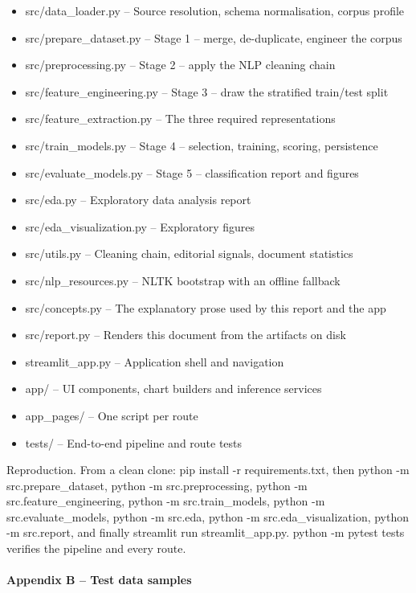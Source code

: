 \documentclass[conference,a4paper]{IEEEtran}
\begin{document}
\begin{itemize}
  \item src/data\_loader.py -- Source resolution, schema normalisation, corpus profile
  \item src/prepare\_dataset.py -- Stage 1 -- merge, de-duplicate, engineer the corpus
  \item src/preprocessing.py -- Stage 2 -- apply the NLP cleaning chain
  \item src/feature\_engineering.py -- Stage 3 -- draw the stratified train/test split
  \item src/feature\_extraction.py -- The three required representations
  \item src/train\_models.py -- Stage 4 -- selection, training, scoring, persistence
  \item src/evaluate\_models.py -- Stage 5 -- classification report and figures
  \item src/eda.py -- Exploratory data analysis report
  \item src/eda\_visualization.py -- Exploratory figures
  \item src/utils.py -- Cleaning chain, editorial signals, document statistics
  \item src/nlp\_resources.py -- NLTK bootstrap with an offline fallback
  \item src/concepts.py -- The explanatory prose used by this report and the app
  \item src/report.py -- Renders this document from the artifacts on disk
  \item streamlit\_app.py -- Application shell and navigation
  \item app/ -- UI components, chart builders and inference services
  \item app\_pages/ -- One script per route
  \item tests/ -- End-to-end pipeline and route tests
\end{itemize}

Reproduction. From a clean clone: pip install -r requirements.txt, then python -m src.prepare\_dataset, python -m src.preprocessing, python -m src.feature\_engineering, python -m src.train\_models, python -m src.evaluate\_models, python -m src.eda, python -m src.eda\_visualization, python -m src.report, and finally streamlit run streamlit\_app.py. python -m pytest tests verifies the pipeline and every route.

\paragraph{Appendix B -- Test data samples}
\end{document}
